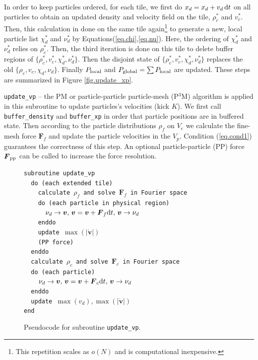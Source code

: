\documentclass[10pt,twocolumn,preprint]{emulateapj}
\newcommand{\bs}{\boldsymbol}
\begin{document}
In order to keep particles ordered, for each tile, we first do $x_d=x_d+v_d\,{\rm d}t$ on all particles to obtain an updated density and velocity field on the tile, $\rho_c^*$ and $v_c^*$. Then, this calculation in done on the same tile again\footnote{This repetition scales as $o(N)$ and is computational inexpensive.} to generate a new, local particle list $\chi_d^*$ and $\nu_d^*$ by Equations(\ref{eq.chi},\ref{eq.nu}). Here, the ordering of $\chi_d^*$ and $\nu_d^*$ relies on $\rho_c^*$. Then, the third iteration is done on this tile to delete buffer regions of $\{\rho_c^*,v_c^*,\chi_d^*,\nu_d^*\}$. Then the disjoint state of $\{\rho_c^*,v_c^*,\chi_d^*,\nu_d^*\}$ replaces the old $\{\rho_c,v_c,\chi_d,\nu_d\}$. Finally $P_{\rm local}$ and $P_{\rm global}=\sum P_{\rm local}$ are updated. These steps are summarized in Figure \ref{fig.update_xp}.

{\tt update\_vp} -- 
the PM or particle-particle particle-mesh (P$^3$M) algorithm is applied in this subroutine to update particles's velocities (kick $K$).
We first call {\tt buffer\_density} and {\tt buffer\_xp} in order that particle positions are in buffered state. Then according to the particle distributions $\rho_f$ on $V_e$ we calculate the fine-mesh force ${\bs F}_f$ and update the particle velocities in the $V_p$. Condition (\ref{eq.cond1}) guarantees the correctness of this step.  An optional particle-particle (PP) force ${\bs F}_{\rm pp}$ can be called to increase the force resolution.

\begin{figure}[t]
{\tt subroutine update\_vp\\
\indent \ \ do (each extended tile)\\
\indent \ \ \ \ calculate $\rho_f$ and solve ${\bs F}_f$ in Fourier space\\
\indent \ \ \ \ do (each particle in physical region)\\
\indent \ \ \ \ \ \ $\nu_d\rightarrow{\bs v},\,{\bs v}={\bs v}+{\bs F}_f{\rm d}t,\, {\bs v}\rightarrow\nu_d$\\
\indent \ \ \ \ enddo\\
\indent \ \ \ \ update $\max(|{\dot{\bs v}}|)$\\
\indent \ \ \ \ (PP force)\\
\indent \ \ enddo\\
\indent \ \ calculate $\rho_c$ and solve ${\bs F}_c$ in Fourier space\\
\indent \ \ do (each particle)\\
\indent \ \ \ \ $\nu_d\rightarrow{\bs v},\,{\bs v}={\bs v}+{\bs F}_c{\rm d}t,\, {\bs v}\rightarrow\nu_d$\\
\indent \ \ enddo\\
\indent \ \ update $\max(v_d),\max(|{\dot{\bs v}}|)$\\
end\\}
\caption{Pseudocode for subroutine {\tt update\_vp}.}
\label{fig.update_vp}
\end{figure}
\end{document}
